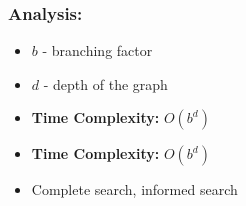 \subsubsection*{Analysis:}

\begin{itemize}
      \item $b$ - branching factor
      \item $d$ - depth of the graph
      \item \textbf{Time Complexity:} $O(b^d)$
      \item \textbf{Time Complexity:} $O(b^d)$
      \item Complete search, informed search
\end{itemize}